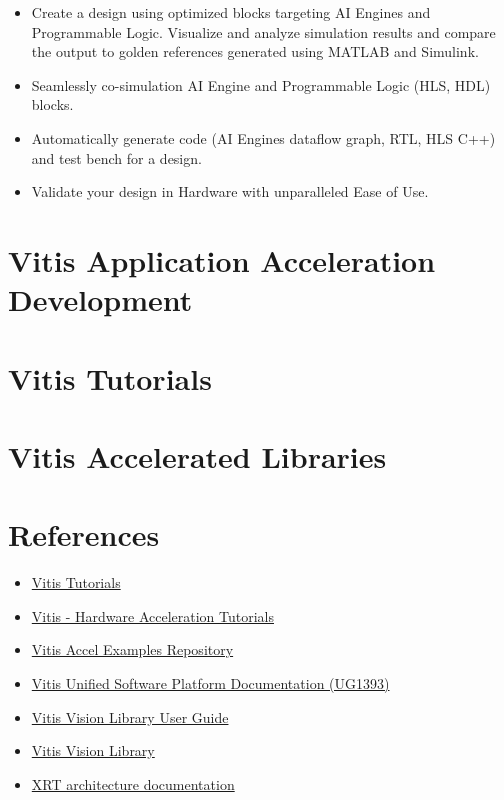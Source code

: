 \documentclass{report}
\begin{document}
	\begin{itemize}
		\item Create a design using optimized blocks targeting AI Engines and Programmable Logic. Visualize and analyze simulation results and compare the output to golden references generated using MATLAB and Simulink.
		\item Seamlessly co-simulation AI Engine and Programmable Logic (HLS, HDL) blocks. 
		\item Automatically generate code (AI Engines dataflow graph, RTL, HLS C++) and test bench for a design. 
		\item Validate your design in Hardware with unparalleled Ease of Use.
	\end{itemize}

	\clearpage
 
	\chapter{Vitis Application Acceleration Development}  
	
	\clearpage

	\chapter{Vitis Tutorials}  
	
	\clearpage 

	\chapter{Vitis Accelerated Libraries}  
	
	\clearpage 

	\chapter{References}
	\begin{itemize}     
		\item \href{https://github.com/Xilinx/Vitis-Tutorials/}{Vitis Tutorials}
		\item \href{https://github.com/Xilinx/Vitis-Tutorials/tree/2021.1/Hardware_Acceleration}{Vitis - Hardware Acceleration Tutorials}
		\item \href{https://github.com/Xilinx/Vitis_Accel_Examples}{Vitis Accel Examples Repository}
		\item \href{https://www.xilinx.com/support/documentation/sw_manuals/xilinx2020_2/ug1393-vitis-application-acceleration.pdf}{Vitis Unified Software Platform Documentation (UG1393)}
		\item \href{https://xilinx.github.io/Vitis_Libraries/vision/2021.2/overview.html#}{Vitis Vision Library User Guide}
		\item \href{https://github.com/Xilinx/Vitis_Libraries/tree/master/vision}{Vitis Vision Library}
		\item \href{https://xilinx.github.io/XRT/}{XRT architecture documentation}
	\end{itemize}

	
\end{document}
